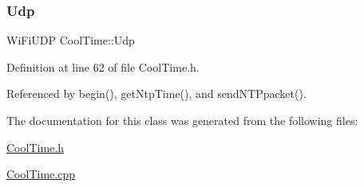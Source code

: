 \subsubsection{\texorpdfstring{Udp}{Udp}}
{\footnotesize\ttfamily Wi\+Fi\+U\+DP Cool\+Time\+::\+Udp\hspace{0.3cm}{\ttfamily [private]}}



Definition at line 62 of file Cool\+Time.\+h.



Referenced by begin(), get\+Ntp\+Time(), and send\+N\+T\+Ppacket().



The documentation for this class was generated from the following files\+:\begin{DoxyCompactItemize}
\item 
\hyperlink{CoolTime_8h}{Cool\+Time.\+h}\item 
\hyperlink{CoolTime_8cpp}{Cool\+Time.\+cpp}\end{DoxyCompactItemize}
